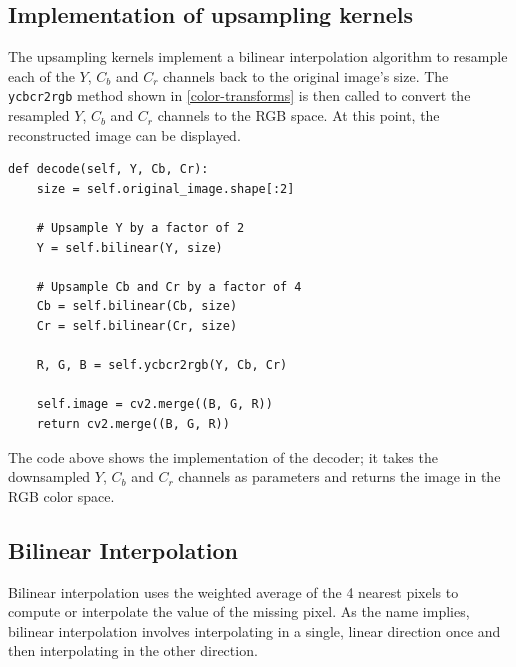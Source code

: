 \documentclass[10pt,twocolumn,letterpaper]{article}
\begin{document}
\subsection{Implementation of upsampling kernels}
The upsampling kernels implement a bilinear interpolation algorithm to resample each of the $Y$, $C_b$ and $C_r$ channels back to the original image's size. The \verb|ycbcr2rgb| method shown in \cref{color-transforms} is then called to convert the resampled $Y$, $C_b$ and $C_r$ channels to the RGB space. At this point, the reconstructed image can be displayed.
{\footnotesize
\begin{verbatim}
def decode(self, Y, Cb, Cr):
    size = self.original_image.shape[:2]

    # Upsample Y by a factor of 2
    Y = self.bilinear(Y, size)

    # Upsample Cb and Cr by a factor of 4
    Cb = self.bilinear(Cb, size)
    Cr = self.bilinear(Cr, size)

    R, G, B = self.ycbcr2rgb(Y, Cb, Cr)

    self.image = cv2.merge((B, G, R))
    return cv2.merge((B, G, R))
\end{verbatim}
}
The code above shows the implementation of the decoder; it takes the downsampled $Y$, $C_b$ and $C_r$ channels as parameters and returns the image in the RGB color space.


\subsection{Bilinear Interpolation}
Bilinear interpolation uses the weighted average of the 4 nearest pixels to compute or interpolate the value of the missing pixel. As the name implies, bilinear interpolation involves interpolating in a single, linear direction once and then interpolating in the other direction. 
\end{document}
